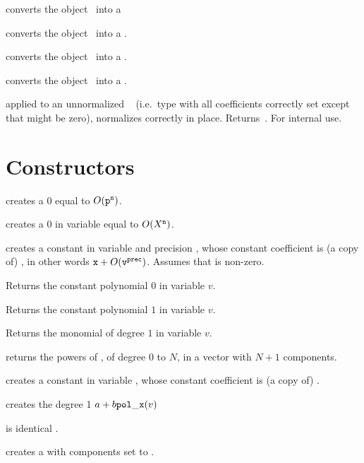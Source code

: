  converts the object~ into a 

 converts the object~ into a .

 converts the object~ into a .

 converts the object~ into a
.

 applied to an unnormalized ~
(i.e.~type  with all coefficients correctly set except that 
might be zero), normalizes  correctly in place. Returns~.
For internal use.

\section{Constructors}

\label{se:clean}

 creates a $0$  equal to
$O({\tt p}^{\tt n})$.

 creates a $0$  in variable
 equal to $O(X^{\tt n})$.

 creates a constant 
in variable  and precision , whose constant coefficient is
(a copy of) , in other words ${\tt x} + O({\tt v}^{\tt prec})$.
Assumes that  is non-zero.

 Returns the constant polynomial $0$ in variable $v$.

 Returns the constant polynomial $1$ in variable $v$.

 Returns the monomial of degree $1$ in variable $v$.

 returns the powers of
, of degree $0$ to $N$, in a vector with $N+1$ components.

 creates a constant  in variable
, whose constant coefficient is (a copy of) .

 creates the degree 1 
$a + b {\tt pol\_x}(v)$

 is identical .

 creates a  with  components set to
.

